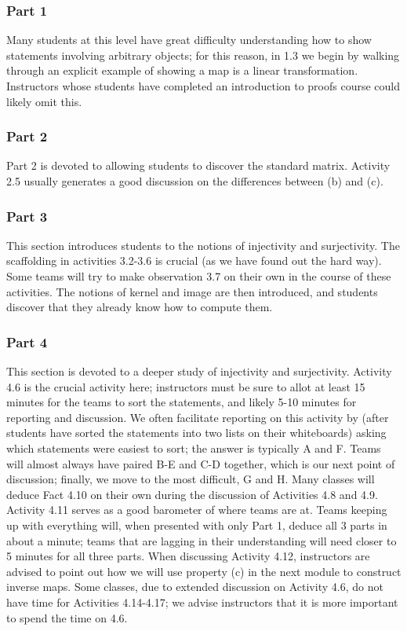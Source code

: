 \documentclass{article}
\begin{document}
\subsubsection*{Part 1}
Many students at this level have great difficulty understanding how to show statements involving arbitrary objects; for this reason, in 1.3 we begin by walking through an explicit example of showing a map is a linear transformation.  Instructors whose students have completed an introduction to proofs course could likely omit this.  

\subsubsection*{Part 2}
Part 2 is devoted to allowing students to discover the standard matrix.  Activity 2.5 usually generates a good discussion on the differences between (b) and (c).  

\subsubsection*{Part 3}
This section introduces students to the notions of injectivity and surjectivity.  The scaffolding in activities 3.2-3.6 is crucial (as we have found out the hard way).  Some teams will try to make observation 3.7 on their own in the course of these activities.  The notions of kernel and image are then introduced, and students discover that they already know how to compute them.

\subsubsection*{Part 4}
This section is devoted to a deeper study of injectivity and surjectivity.  Activity 4.6 is the crucial activity here; instructors must be sure to allot at least 15 minutes for the teams to sort the statements, and likely 5-10 minutes for reporting and discussion.  We often facilitate reporting on this activity by (after students have sorted the statements into two lists on their whiteboards) asking which statements were easiest to sort; the answer is typically A and F.  Teams will almost always have paired B-E and C-D together, which is our next point of discussion; finally, we move to the most difficult, G and H.  Many classes will deduce Fact 4.10 on their own during the discussion of Activities 4.8 and 4.9.  Activity 4.11 serves as a good barometer of where teams are at.  Teams keeping up with everything will, when presented with only Part 1, deduce all 3 parts in about a minute; teams that are lagging in their understanding will need closer to 5 minutes for all three parts.  When discussing Activity 4.12, instructors are advised to point out how we will use property (c) in the next module to construct inverse maps.  Some classes, due to extended discussion on Activity 4.6, do not have time for Activities 4.14-4.17; we advise instructors that it is more important to spend the time on 4.6.
\end{document}
